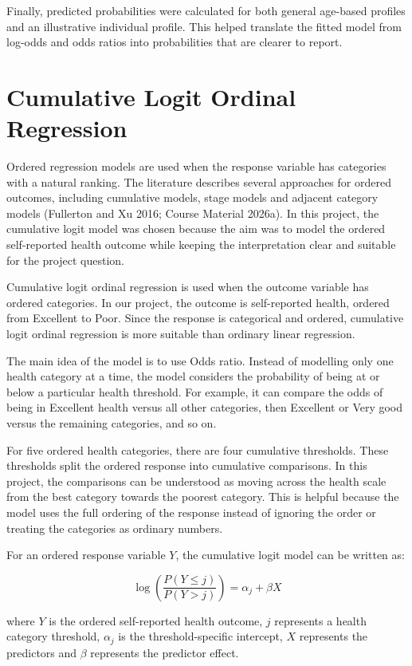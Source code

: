 \documentclass{article}
\begin{document}
Finally, predicted probabilities were calculated for both general
age-based profiles and an illustrative individual profile. This helped
translate the fitted model from log-odds and odds ratios into
probabilities that are clearer to report.

\section{Cumulative Logit Ordinal
Regression}\label{cumulative-logit-ordinal-regression}

Ordered regression models are used when the response variable has
categories with a natural ranking. The literature describes several
approaches for ordered outcomes, including cumulative models, stage
models and adjacent category models (Fullerton and Xu 2016; Course
Material 2026a). In this project, the cumulative logit model was chosen
because the aim was to model the ordered self-reported health outcome
while keeping the interpretation clear and suitable for the project
question.

Cumulative logit ordinal regression is used when the outcome variable
has ordered categories. In our project, the outcome is self-reported
health, ordered from Excellent to Poor. Since the response is
categorical and ordered, cumulative logit ordinal regression is more
suitable than ordinary linear regression.

The main idea of the model is to use Odds ratio. Instead of modelling
only one health category at a time, the model considers the probability
of being at or below a particular health threshold. For example, it can
compare the odds of being in Excellent health versus all other
categories, then Excellent or Very good versus the remaining categories,
and so on.

For five ordered health categories, there are four cumulative
thresholds. These thresholds split the ordered response into cumulative
comparisons. In this project, the comparisons can be understood as
moving across the health scale from the best category towards the
poorest category. This is helpful because the model uses the full
ordering of the response instead of ignoring the order or treating the
categories as ordinary numbers.

For an ordered response variable \(Y\), the cumulative logit model can
be written as:

\[
\log \left(\frac{P(Y \leq j)}{P(Y > j)}\right) = \alpha_j + \beta X
\]

where \(Y\) is the ordered self-reported health outcome, \(j\)
represents a health category threshold, \(\alpha_j\) is the
threshold-specific intercept, \(X\) represents the predictors and
\(\beta\) represents the predictor effect.
\end{document}
